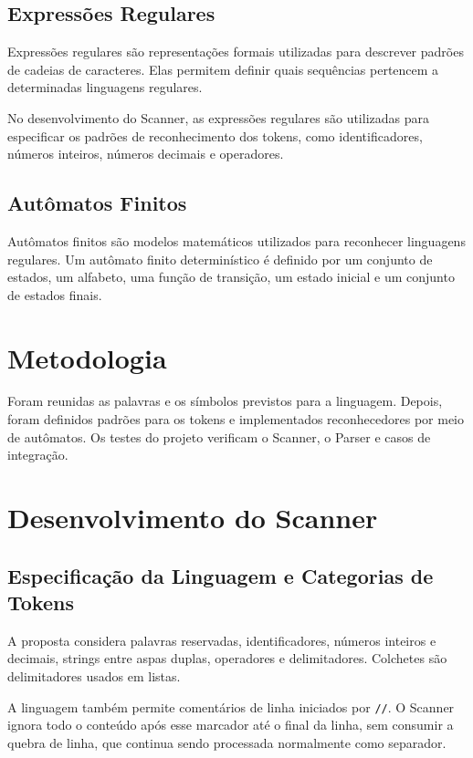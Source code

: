 \documentclass[12pt,a4paper]{article}
\begin{document}
\subsection{Expressões Regulares}

Expressões regulares são representações formais utilizadas para descrever padrões de cadeias de caracteres. Elas permitem definir quais sequências pertencem a determinadas linguagens regulares.

No desenvolvimento do Scanner, as expressões regulares são utilizadas para especificar os padrões de reconhecimento dos tokens, como identificadores, números inteiros, números decimais e operadores.


\subsection{Autômatos Finitos}

Autômatos finitos são modelos matemáticos utilizados para reconhecer linguagens regulares. Um autômato finito determinístico é definido por um conjunto de estados, um alfabeto, uma função de transição, um estado inicial e um conjunto de estados finais.


\section{Metodologia}

Foram reunidas as palavras e os símbolos previstos para a linguagem. Depois, foram definidos padrões para os tokens e implementados reconhecedores por meio de autômatos. Os testes do projeto verificam o Scanner, o Parser e casos de integração.


\section{Desenvolvimento do Scanner}

\subsection{Especificação da Linguagem e Categorias de Tokens}

A proposta considera palavras reservadas, identificadores, números inteiros e decimais, strings entre aspas duplas, operadores e delimitadores. Colchetes são delimitadores usados em listas.

A linguagem também permite comentários de linha iniciados por \texttt{//}. O Scanner ignora todo o conteúdo após esse marcador até o final da linha, sem consumir a quebra de linha, que continua sendo processada normalmente como separador.
\end{document}
